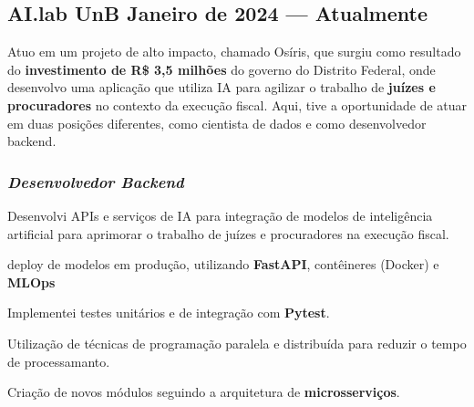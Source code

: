 \documentclass[a4paper,12pt]{article}
\begin{document}



\subsection*{\large AI.lab UnB \hfill Janeiro de 2024 --- Atualmente}


Atuo em um projeto de alto impacto, chamado Osíris, que surgiu como resultado do \textbf{investimento de R\$ 3,5
milhões} do governo do Distrito Federal, onde desenvolvo uma aplicação que utiliza IA
para agilizar o trabalho de \textbf{juízes e procuradores} no contexto da execução fiscal. Aqui, tive a oportunidade
de atuar em duas posições diferentes, como cientista de dados e como desenvolvedor backend.

\vspace{0.5em}

\vspace{1em}

\subsubsection*{\small \textit{Desenvolvedor Backend} }
\vspace{-1em}
\vspace{-0.5em}
\begin{zitemize}
    \item Desenvolvi APIs e serviços de IA para integração de modelos de inteligência artificial para aprimorar o trabalho de juízes e procuradores na execução fiscal.
    \item deploy de modelos em produção, utilizando  \textbf{FastAPI}, contêineres (Docker) e \textbf{MLOps}
    \item Implementei testes unitários e de integração com \textbf{Pytest}.
    \item Utilização de técnicas de programação paralela e distribuída para reduzir o tempo de processamanto.
    \item Criação de novos módulos seguindo a arquitetura de \textbf{microsserviços}.
\end{zitemize}
\end{document}

